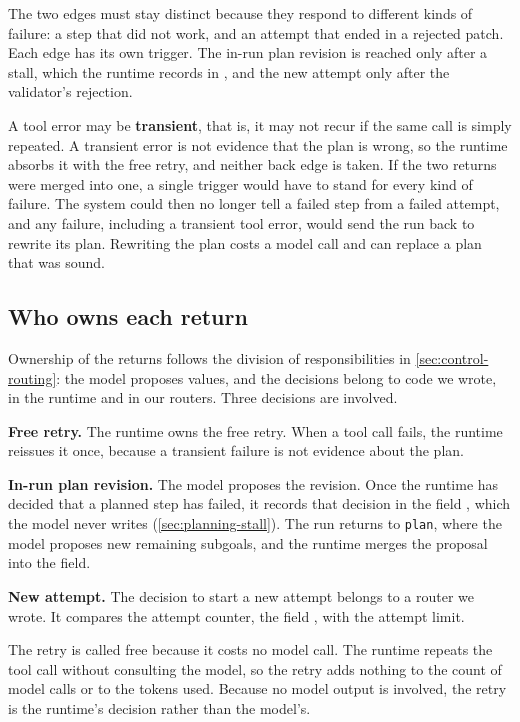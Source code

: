The two edges must stay distinct because they respond to different kinds of failure: a step that
did not work, and an attempt that ended in a rejected patch. Each edge has its own trigger. The
in-run plan revision is reached only after a stall, which the runtime records in
, and the new attempt only after the validator's rejection.

A tool error may be \textbf{transient}, that is, it may not recur if the same call is simply
repeated. A transient error is not evidence that the plan is wrong, so the runtime absorbs it with
the free retry, and neither back edge is taken. If the two returns were merged into one, a single
trigger would have to stand for every kind of failure. The system could then no longer tell a failed
step from a failed attempt, and any failure, including a transient tool error, would send the run
back to rewrite its plan. Rewriting the plan costs a model call and can replace a plan that was
sound.

\subsection{Who owns each return}
\label{sec:control-owners}

Ownership of the returns follows the division of responsibilities in \cref{sec:control-routing}:
the model proposes values, and the decisions belong to code we wrote, in the runtime and in our
routers. Three decisions are involved.

\bi
\item \textbf{Free retry.} The runtime owns the free retry. When a tool call fails, the runtime
reissues it once, because a transient failure is not evidence about the plan.
\item \textbf{In-run plan revision.} The model proposes the revision. Once the runtime has decided
that a planned step has failed, it records that decision in the field , which
the model never writes (\cref{sec:planning-stall}). The run returns to \texttt{plan}, where the
model proposes new remaining subgoals, and the runtime merges the proposal into the 
field.
\item \textbf{New attempt.} The decision to start a new attempt belongs to a router we wrote. It
compares the attempt counter, the field , with the attempt limit.
\ei

The retry is called free because it costs no model call. The runtime repeats the tool call without
consulting the model, so the retry adds nothing to the count of model calls or to the tokens used.
Because no model output is involved, the retry is the runtime's decision rather than the model's.

